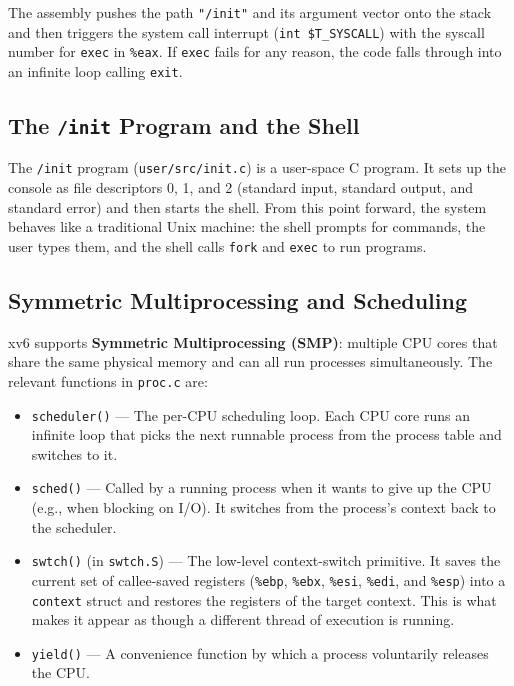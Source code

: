\documentclass[11pt]{article}
\begin{document}
The assembly pushes the path \texttt{"/init"} and its argument vector onto the stack and then triggers the system call interrupt (\texttt{int \$T\_SYSCALL}) with the syscall number for \texttt{exec} in \texttt{\%eax}. If \texttt{exec} fails for any reason, the code falls through into an infinite loop calling \texttt{exit}.

\subsection{The \texttt{/init} Program and the Shell}

The \texttt{/init} program (\texttt{user/src/init.c}) is a user-space C program. It sets up the console as file descriptors 0, 1, and 2 (standard input, standard output, and standard error) and then starts the shell. From this point forward, the system behaves like a traditional Unix machine: the shell prompts for commands, the user types them, and the shell calls \texttt{fork} and \texttt{exec} to run programs.

\subsection{Symmetric Multiprocessing and Scheduling}

xv6 supports \textbf{Symmetric Multiprocessing (SMP)}: multiple CPU cores that share the same physical memory and can all run processes simultaneously. The relevant functions in \texttt{proc.c} are:

\begin{itemize}
    \item \texttt{scheduler()} --- The per-CPU scheduling loop. Each CPU core runs an infinite loop that picks the next runnable process from the process table and switches to it.
    \item \texttt{sched()} --- Called by a running process when it wants to give up the CPU (e.g., when blocking on I/O). It switches from the process's context back to the scheduler.
    \item \texttt{swtch()} (in \texttt{swtch.S}) --- The low-level context-switch primitive. It saves the current set of callee-saved registers (\texttt{\%ebp}, \texttt{\%ebx}, \texttt{\%esi}, \texttt{\%edi}, and \texttt{\%esp}) into a \texttt{context} struct and restores the registers of the target context. This is what makes it appear as though a different thread of execution is running.
    \item \texttt{yield()} --- A convenience function by which a process voluntarily releases the CPU.
\end{itemize}
\end{document}
